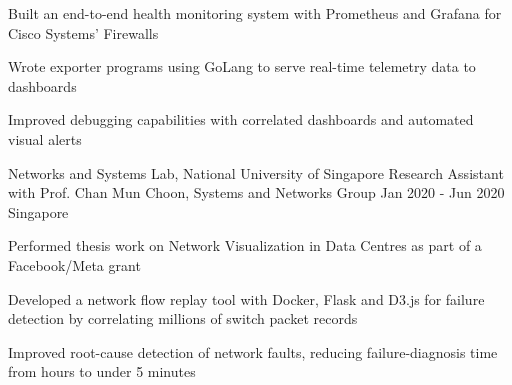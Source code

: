 
\resumeItemListStart
\item[$\bullet$]{Built an end-to-end health monitoring system with Prometheus and Grafana for Cisco Systems' Firewalls}
	\item[$\bullet$]{Wrote exporter programs using GoLang to serve real-time telemetry data to dashboards}
	\item[$\bullet$]{Improved debugging capabilities with correlated dashboards and automated visual alerts}
\resumeItemListEnd

\resumeExp
{Networks and Systems Lab, National University of Singapore}
{Research Assistant with Prof. Chan Mun Choon, Systems and Networks Group}
{Jan 2020 - Jun 2020}
{Singapore}

\resumeItemListStart
\item[$\bullet$] {Performed thesis work on Network Visualization in Data Centres as part of a Facebook/Meta grant}
	    \item[$\bullet$] {Developed a network flow replay tool with Docker, Flask and D3.js for failure detection by correlating millions of switch packet records}
	    \item[$\bullet$] {Improved root-cause detection of network faults, reducing failure-diagnosis time from hours to under 5 minutes} 
\resumeItemListEnd

\resumeSubHeadingListEnd
\vspace{-5.5mm}